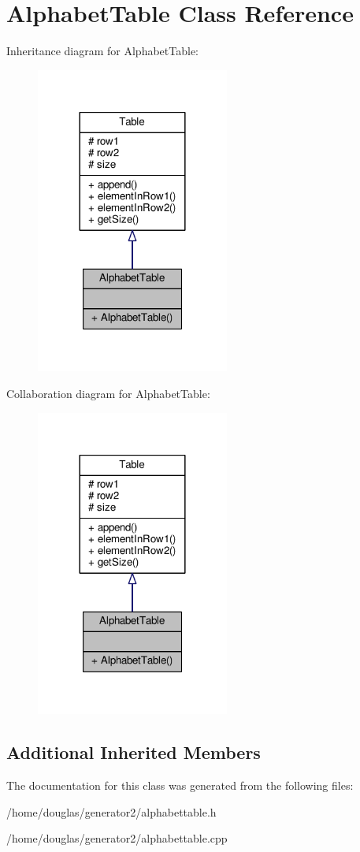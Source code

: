 \hypertarget{classAlphabetTable}{}\section{Alphabet\+Table Class Reference}
\label{classAlphabetTable}


Inheritance diagram for Alphabet\+Table\+:
\nopagebreak
\begin{figure}[H]
\begin{center}
\leavevmode
\includegraphics[width=180pt]{classAlphabetTable__inherit__graph}
\end{center}
\end{figure}


Collaboration diagram for Alphabet\+Table\+:
\nopagebreak
\begin{figure}[H]
\begin{center}
\leavevmode
\includegraphics[width=180pt]{classAlphabetTable__coll__graph}
\end{center}
\end{figure}
\subsection*{Additional Inherited Members}


The documentation for this class was generated from the following files\+:\begin{DoxyCompactItemize}
\item 
/home/douglas/generator2/alphabettable.\+h\item 
/home/douglas/generator2/alphabettable.\+cpp\end{DoxyCompactItemize}
